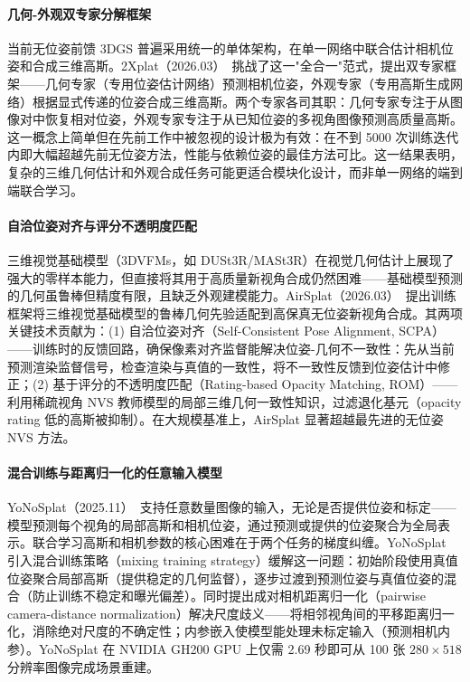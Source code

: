 \paragraph{几何-外观双专家分解框架}

当前无位姿前馈 3DGS 普遍采用统一的单体架构，在单一网络中联合估计相机位姿和合成三维高斯。2Xplat（2026.03）~\cite{2603_21064}挑战了这一"全合一"范式，提出双专家框架——几何专家（专用位姿估计网络）预测相机位姿，外观专家（专用高斯生成网络）根据显式传递的位姿合成三维高斯。两个专家各司其职：几何专家专注于从图像对中恢复相对位姿，外观专家专注于从已知位姿的多视角图像预测高质量高斯。这一概念上简单但在先前工作中被忽视的设计极为有效：在不到 5000 次训练迭代内即大幅超越先前无位姿方法，性能与依赖位姿的最佳方法可比。这一结果表明，复杂的三维几何估计和外观合成任务可能更适合模块化设计，而非单一网络的端到端联合学习。

\paragraph{自洽位姿对齐与评分不透明度匹配}

三维视觉基础模型（3DVFMs，如 DUSt3R/MASt3R）在视觉几何估计上展现了强大的零样本能力，但直接将其用于高质量新视角合成仍然困难——基础模型预测的几何虽鲁棒但精度有限，且缺乏外观建模能力。AirSplat（2026.03）~\cite{2603_25129}提出训练框架将三维视觉基础模型的鲁棒几何先验适配到高保真无位姿新视角合成。其两项关键技术贡献为：(1) 自洽位姿对齐（Self-Consistent Pose Alignment, SCPA）——训练时的反馈回路，确保像素对齐监督能解决位姿-几何不一致性：先从当前预测渲染监督信号，检查渲染与真值的一致性，将不一致性反馈到位姿估计中修正；(2) 基于评分的不透明度匹配（Rating-based Opacity Matching, ROM）——利用稀疏视角 NVS 教师模型的局部三维几何一致性知识，过滤退化基元（opacity rating 低的高斯被抑制）。在大规模基准上，AirSplat 显著超越最先进的无位姿 NVS 方法。

\paragraph{混合训练与距离归一化的任意输入模型}

YoNoSplat（2025.11）~\cite{2511_07321}支持任意数量图像的输入，无论是否提供位姿和标定——模型预测每个视角的局部高斯和相机位姿，通过预测或提供的位姿聚合为全局表示。联合学习高斯和相机参数的核心困难在于两个任务的梯度纠缠。YoNoSplat 引入混合训练策略（mixing training strategy）缓解这一问题：初始阶段使用真值位姿聚合局部高斯（提供稳定的几何监督），逐步过渡到预测位姿与真值位姿的混合（防止训练不稳定和曝光偏差）。同时提出成对相机距离归一化（pairwise camera-distance normalization）解决尺度歧义——将相邻视角间的平移距离归一化，消除绝对尺度的不确定性；内参嵌入使模型能处理未标定输入（预测相机内参）。YoNoSplat 在 NVIDIA GH200 GPU 上仅需 2.69 秒即可从 100 张 $280 \times 518$ 分辨率图像完成场景重建。

